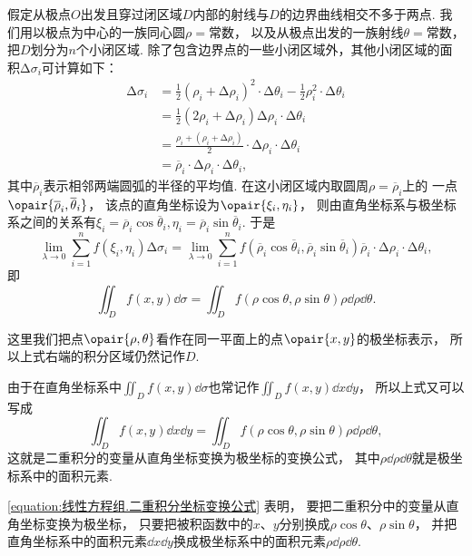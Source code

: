 假定从极点\(O\)出发且穿过闭区域\(D\)内部的射线与\(D\)的边界曲线相交不多于两点.
我们用以极点为中心的一族同心圆\(\rho = \text{常数}\)，
以及从极点出发的一族射线\(\theta = \text{常数}\)，
把\(D\)划分为\(n\)个小闭区域.
除了包含边界点的一些小闭区域外，其他小闭区域的面积\(\increment\sigma_i\)可计算如下：
\begin{align*}
	\increment\sigma_i
	&= \frac{1}{2} (\rho_i+\increment\rho_i)^2 \cdot \increment\theta_i
	- \frac{1}{2} \rho_i^2 \cdot \increment\theta_i \\
	&= \frac{1}{2} (2\rho_i + \increment\rho_i) \increment\rho_i \cdot \increment\theta_i \\
	&= \frac{\rho_i + (\rho_i+\increment\rho_i)}{2}
		\cdot \increment\rho_i \cdot \increment\theta_i \\
	&= \overline{\rho}_i \cdot \increment\rho_i \cdot \increment\theta_i,
\end{align*}
其中\(\overline{\rho}_i\)表示相邻两端圆弧的半径的平均值.
在这小闭区域内取圆周\(\rho = \overline{\rho}_i\)上的
一点\(\opair{\overline{\rho}_i,\overline{\theta}_i}\)，
该点的直角坐标设为\(\opair{\xi_i,\eta_i}\)，
则由直角坐标系与极坐标系之间的关系有\(\xi_i = \overline{\rho}_i \cos\overline{\theta}_i,
\eta_i = \overline{\rho}_i \sin\overline{\theta}_i\).
于是\[
	\lim\limits_{\lambda\to0} \sum\limits_{i=1}^n f(\xi_i,\eta_i) \increment\sigma_i
	= \lim\limits_{\lambda\to0} \sum\limits_{i=1}^n
	f(\overline{\rho}_i \cos\overline{\theta}_i,\overline{\rho}_i \sin\overline{\theta}_i)
	\overline{\rho}_i \cdot \increment\rho_i \cdot \increment\theta_i,
\]
即\[
	\iint_D f(x,y) \dd{\sigma}
	= \iint_D f(\rho\cos\theta,\rho\sin\theta) \rho \dd{\rho} \dd{\theta}.
\]

这里我们把点\(\opair{\rho,\theta}\)看作在同一平面上的点\(\opair{x,y}\)的极坐标表示，
所以上式右端的积分区域仍然记作\(D\).

由于在直角坐标系中\(\iint_D f(x,y) \dd{\sigma}\)也常记作\(\iint_D f(x,y) \dd{x} \dd{y}\)，
所以上式又可以写成
\begin{equation}\label{equation:线性方程组.二重积分坐标变换公式}
\iint_D f(x,y) \dd{x} \dd{y}
= \iint_D f(\rho\cos\theta,\rho\sin\theta) \rho \dd{\rho} \dd{\theta},
\end{equation}
这就是二重积分的变量从直角坐标变换为极坐标的变换公式，
其中\(\rho \dd{\rho} \dd{\theta}\)就是极坐标系中的面积元素.

\cref{equation:线性方程组.二重积分坐标变换公式} 表明，
要把二重积分中的变量从直角坐标变换为极坐标，
只要把被积函数中的\(x\)、\(y\)分别换成\(\rho \cos\theta\)、\(\rho \sin\theta\)，
并把直角坐标系中的面积元素\(\dd{x} \dd{y}\)换成极坐标系中的面积元素\(\rho \dd{\rho} \dd{\theta}\).

